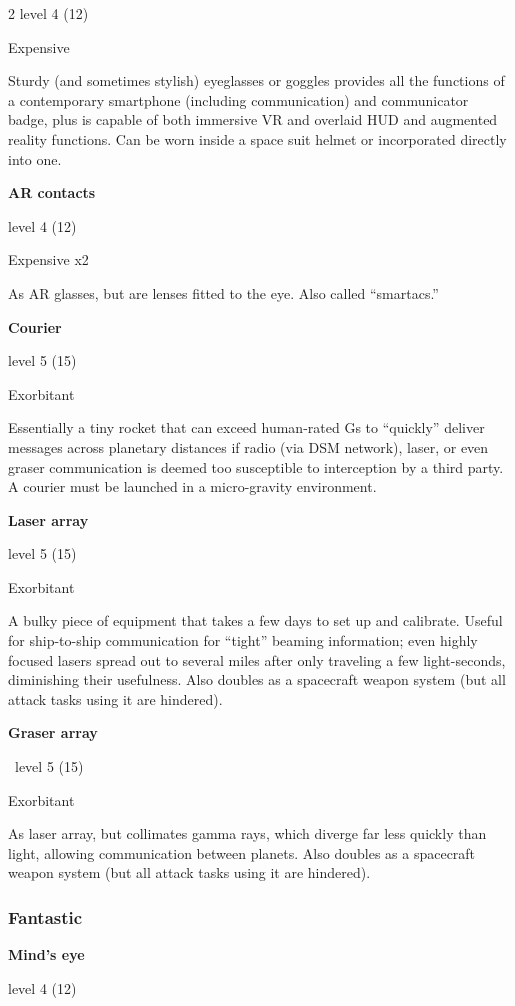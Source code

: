 \begin{multicols}{2}
level 4 (12) 

Expensive 

Sturdy (and sometimes stylish) eyeglasses or goggles provides all the functions of a contemporary smartphone (including communication) and communicator badge, plus is capable of both immersive VR and overlaid HUD and augmented reality functions. Can be worn inside a space suit helmet or incorporated directly into one. 

\textbf{AR contacts}

level 4 (12) 

Expensive x2 

As AR glasses, but are lenses fitted to the eye. Also called “smartacs.” 

\textbf{Courier}

level 5 (15) 

Exorbitant 

Essentially a tiny rocket that can exceed human-rated Gs to “quickly” deliver messages across planetary distances if radio (via DSM network), laser, or even graser communication is deemed too susceptible to interception by a third party. A courier must be launched in a micro-gravity environment. 

\textbf{Laser array}

level 5 (15) 

Exorbitant

A bulky piece of equipment that takes a few days to set up and calibrate. Useful for ship-to-ship communication for “tight” beaming information; even highly focused lasers spread out to several miles after only traveling a few light-seconds, diminishing their usefulness. Also doubles as a spacecraft weapon system (but all attack tasks using it are hindered). 

\textbf{Graser array}

 level 5 (15) 

Exorbitant 

As laser array, but collimates gamma rays, which diverge far less quickly than light, allowing communication between planets. Also doubles as a spacecraft weapon system (but all attack tasks using it are hindered).

\subsubsection{Fantastic}

\textbf{Mind’s eye}

level 4 (12) 


\end{multicols}
